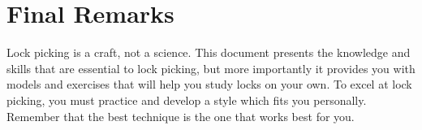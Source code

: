 \chapter{Final Remarks}
Lock picking is a craft, not a science. This document presents the knowledge and skills that 
are essential to lock picking, but more importantly it provides you with models and exercises 
that will help you study locks on your own. To excel at lock picking, you must practice and 
develop a style which fits you personally. Remember that the best technique is the one that 
works best for you.
